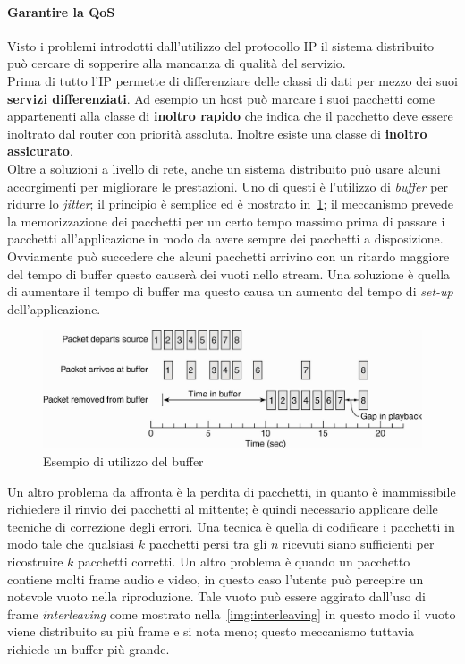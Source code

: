 \paragraph{Garantire la QoS}
Visto i problemi introdotti dall'utilizzo del protocollo IP il sistema distribuito può cercare di sopperire alla mancanza di qualità del servizio.\\
Prima di tutto l'IP permette di differenziare delle classi di dati per mezzo dei suoi \textbf{servizi differenziati}. Ad esempio un host può marcare i suoi pacchetti come appartenenti alla classe di \textbf{inoltro rapido} che indica che il pacchetto deve essere inoltrato dal router con priorità assoluta. Inoltre esiste una classe di \textbf{inoltro assicurato}.\\
Oltre a soluzioni a livello di rete, anche un sistema distribuito può usare alcuni accorgimenti per migliorare le prestazioni. Uno di questi è l'utilizzo di \emph{buffer} per ridurre lo \emph{jitter}; il principio è semplice ed è mostrato in \figurename\,\ref{img:buffer}; il meccanismo prevede la memorizzazione dei pacchetti per un certo tempo massimo prima di passare i pacchetti all'applicazione in modo da avere sempre dei pacchetti a disposizione. Ovviamente può succedere che alcuni pacchetti arrivino con un ritardo maggiore del tempo di buffer questo causerà dei vuoti nello stream. Una soluzione è quella di aumentare il tempo di buffer ma questo causa un aumento del tempo di \emph{set-up} dell'applicazione.\\
\begin{figure}
\centering
\includegraphics[scale=0.35]{img/buffer.png}
\caption{Esempio di utilizzo del buffer}\label{img:buffer}
\end{figure}
Un altro problema da affronta è la perdita di pacchetti, in quanto è inammissibile richiedere il rinvio dei pacchetti al mittente; è quindi necessario applicare delle tecniche di correzione degli errori. Una tecnica è quella di codificare i pacchetti in modo tale che qualsiasi $k$ pacchetti persi tra gli $n$ ricevuti siano sufficienti per ricostruire $k$ pacchetti corretti. Un altro problema è quando un pacchetto contiene molti frame audio e video, in questo caso l'utente può percepire un notevole vuoto nella riproduzione. Tale vuoto può essere aggirato dall'uso di frame \emph{interleaving} come mostrato nella \figurename\,\ref{img:interleaving} in questo modo il vuoto viene distribuito su più frame e si nota meno; questo meccanismo tuttavia richiede un buffer più grande.

